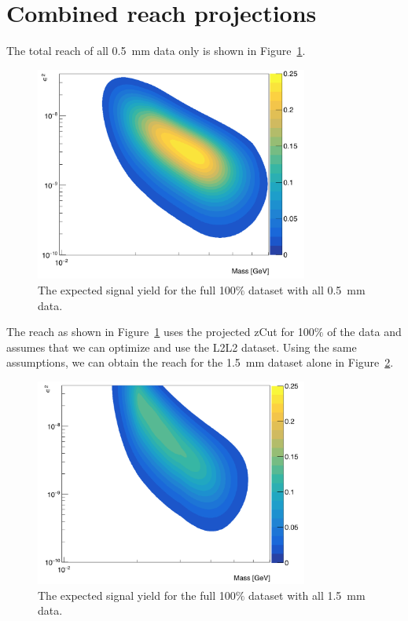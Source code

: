 \section{Combined reach projections}

The total reach of all 0.5~mm data only is shown in Figure~\ref{fig:reach0p5only}.

\begin{figure}[H]
  \centering
     \includegraphics[width=0.8\textwidth]{plots/reachall_0p5.png}
  \caption{The expected signal yield for the full 100$\%$ dataset with all 0.5~mm data.}
  \label{fig:reach0p5only}
\end{figure} 

The reach as shown in Figure~\ref{fig:reach0p5only} uses the projected zCut for 100$\%$ of the data and assumes that we can optimize and use the L2L2 dataset. Using the same assumptions, we can obtain the reach for the 1.5~mm dataset alone in Figure~\ref{fig:reach1p5only}.

\begin{figure}[H]
  \centering
     \includegraphics[width=0.8\textwidth]{plots/reachall_1p5.png}
  \caption{The expected signal yield for the full 100$\%$ dataset with all 1.5~mm data.}
  \label{fig:reach1p5only}
\end{figure} 

